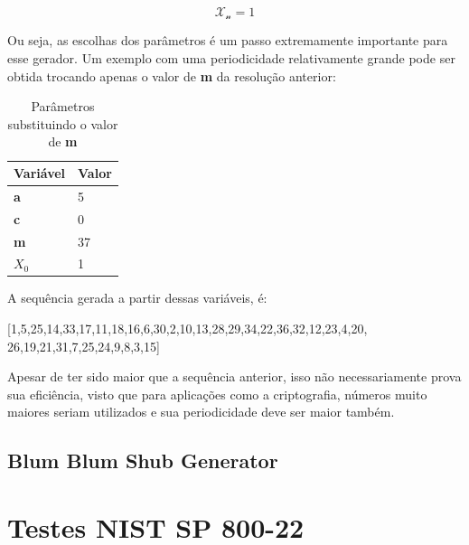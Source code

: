 \begin{equation}
	\label{Resultado do quinto valor}
	\mathcal{X_n} = 1
\end{equation}

Ou seja, as escolhas dos parâmetros é um passo extremamente importante para esse gerador. Um exemplo com uma periodicidade relativamente grande pode ser obtida trocando apenas o valor de \textbf{m} da resolução anterior:

\begin{table}[h]
	\centering
	\begin{tabular}{|l|l|}	
		\hline
		Variável & Valor \\ \hline
		\textbf{a} & 5 \\ \hline
		\textbf{c} & 0 \\ \hline
		\textbf{m} & 37 \\ \hline
		\textbf{$X_0$} & 1 \\ \hline
	\end{tabular}
	\caption{Parâmetros substituindo o valor de \textbf{m}}
\end{table}

A sequência gerada a partir dessas variáveis, é:

[1,5,25,14,33,17,11,18,16,6,30,2,10,13,28,29,34,22,36,32,12,23,4,20,
26,19,21,31,7,25,24,9,8,3,15]

Apesar de ter sido maior que a sequência anterior, isso não necessariamente prova sua eficiência, visto que para aplicações como a criptografia, números muito maiores seriam utilizados e sua periodicidade deve ser maior também.


\subsection{Blum Blum Shub Generator}

\section{Testes NIST SP 800-22}
